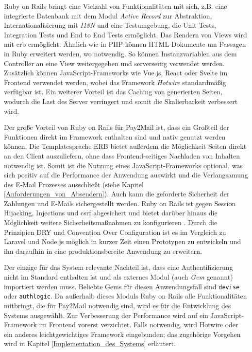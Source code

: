 Ruby on Rails bringt eine Vielzahl von Funktionalitäten mit sich, z.B. eine integrierte Datenbank mit dem Modul \textit{Active Record} zur Abstraktion, Internationalisierung mit \textit{I18N} und eine Testumgebung, die Unit Tests, Integration Tests und End to End Tests ermöglicht. Das Rendern von Views wird mit \acrfull{erb} ermöglicht. Ähnlich wie in PHP können HTML-Dokumente um Passagen in Ruby erweitert werden, wo notwendig. So können Instanzvariablen aus dem Controller an eine View weitergegeben und serverseitig verwendet werden. Zusätzlich können JavaScript-Frameworks wie Vue.js, React oder Svelte im Frontend verwendet werden, wobei das Framework \textit{Hotwire} standardmäßig verfügbar ist. Ein weiterer Vorteil ist das Caching von generierten Seiten, wodurch die Last des Server verringert und somit die Skalierbarkeit verbessert wird.

Der große Vorteil von Ruby on Rails für Pay2Mail ist, dass ein Großteil der Funktionen direkt im Framework enthalten sind und nativ genutzt werden können. Die Templatesprache ERB bietet außerdem die Möglichkeit Seiten direkt an den Client auszuliefern, ohne dass Frontend-seitiges Nachladen von Inhalten notwendig ist. Somit ist die Nutzung eines JavaScript-Frameworks optional, was sich positiv auf die Performance der Anwendung auswirkt und die Verlangsamung des E-Mail Prozesses ausschließt (siehe Kapitel \ref{Anforderungen_von_Absendern}). Auch kann die geforderte Sicherheit der Zahlungen und E-Mails sichergestellt werden. Ruby on Rails ist gegen Session Hijacking, Injections und \acrfull{csrf} abgesichert und bietet darüber hinaus die Möglichkeit weitere Sicherheitsmaßnahmen zu konfigurieren \citep{Hansson2022}. Durch die Prinzipien DRY und Convention Over Configuration ist es im Vergleich zu Laravel und Node.js möglich in kurzer Zeit einen Prototypen zu entwickeln und ihn daraufhin in eine produktionsbereite Anwendung zu erweitern.

Der einzige für das System relevante Nachteil ist, dass eine Authentifizierung nicht im Standard enthalten ist und als externes Modul (auch \textit{Gem} genannt) importiert werden muss. Beliebte Gems für diesen Anwendungsfall sind \texttt{devise} oder \texttt{authlogic}. Da außerhalb dieses Moduls Ruby on Rails alle Funktionalitäten mitbringt, die für Pay2Mail notwendig sind, wird es für die Entwicklung des Systems ausgewählt. Zur Verbesserung der Performance wird auf ein JavaScript-Framework im Frontend vorerst verzichtet. Falls notwendig, wird Hotwire oder ein anderes leichtgewichtiges Framework eingebunden; das zugehörige Vorgehen wird in Kapitel \ref{Implementation_des_Systems} erläutert.